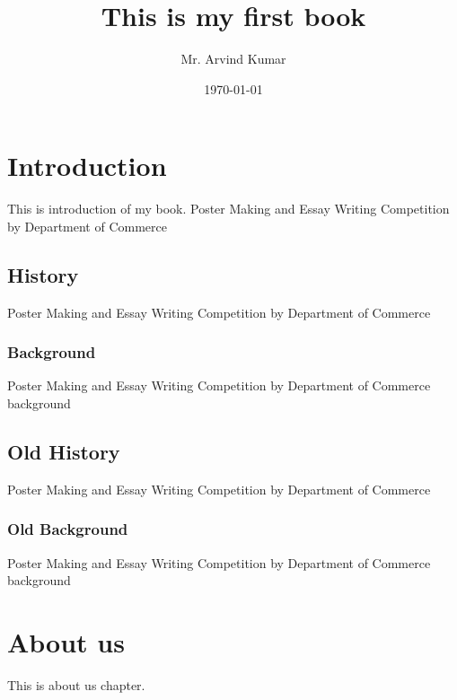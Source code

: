 \documentclass{book}
\begin{document}
	\title{This is my first book}
	\author{Mr. Arvind Kumar}
	\date{\today}
	\maketitle
	\chapter{Introduction}
	This is introduction of my book. Poster Making and Essay Writing Competition by Department of Commerce 
	\section{History}
	Poster Making and Essay Writing Competition by Department of Commerce 
	\subsection{Background}
	Poster Making and Essay Writing Competition by Department of Commerce background	
	\section{Old History}
	Poster Making and Essay Writing Competition by Department of Commerce 
	\subsection{Old Background}
	Poster Making and Essay Writing Competition by Department of Commerce background	
	\chapter{About us}
	This is about us chapter.
	
\end{document}
